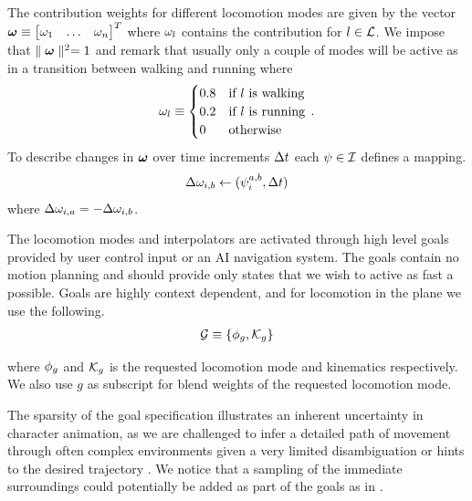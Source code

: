  The contribution weights for different locomotion modes are given by the vector $\boldsymbol{\omega } \equiv \begin{bmatrix}\omega_1 & \ldots & \omega_n \end{bmatrix}^T$ where $\omega_l$ contains the contribution for $l \in \mathcal{L}$. We impose that $\parallel {  \boldsymbol{\omega }  } \parallel^2 = 1$ and remark that usually only a couple of modes will be active as in a transition between walking and running where 
\begin{equation}
    \label{eq:contribusion:weight:example}
    \omega_l \equiv
    \begin{cases}
    0.8 & \text{if $l$ is walking} \\
    0.2 & \text{if $l$ is running} \\
    0 & \text{otherwise}
    \end{cases}\,.
\end{equation}
To describe changes in $\boldsymbol{\omega }$ over time increments $\Delta{t}$ each $\psi \in \mathcal{I}$ defines a mapping. 
\begin{equation}
\Delta{ \omega }_{i,b} \leftarrow (\psi_{i}^{a,b},\Delta{t})
\end{equation}
where $\Delta{ \omega }_{i,a}=-\Delta{ \omega }_{i,b}$.

The locomotion modes and interpolators are activated through high level goals provided by user control input or an AI navigation system. The goals contain no motion planning and should provide only states that we wish to active as fast a possible. Goals are highly context dependent, and for locomotion in the plane we use the following.
\begin{subequations}
\begin{align}
     \mathcal{G} &\equiv \left\{ \phi_g, \mathcal{K}_g \right\} \label{eq:goals:def} \\
\end{align}
\end{subequations}

where $\phi_g$ and $\mathcal{K}_g$ is the requested locomotion mode and kinematics respectively. We also use $g$ as subscript for blend weights of the requested locomotion mode.

The sparsity of the goal specification illustrates an inherent uncertainty in character animation, as we are challenged to infer a detailed path of movement through often complex environments given a very limited disambiguation or hints to the desired trajectory \cite{holden.ea16}. We notice that a sampling of the immediate surroundings could potentially be added as part of the goals as in \cite{holden.ea17}. 

